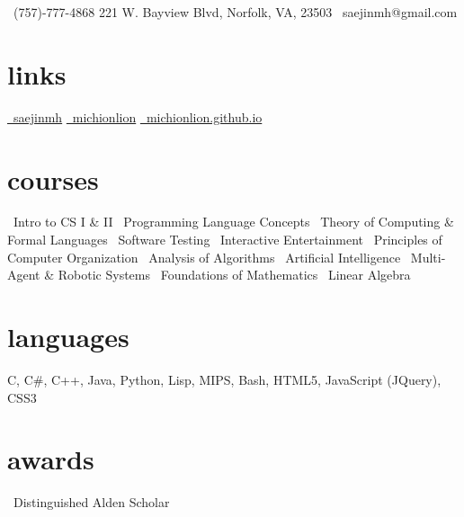 \documentclass[]{friggeri-cv}
\begin{document}
       {\faMobilePhone\ (757)-777-4868 \hspace{1cm} 221 W. Bayview Blvd, Norfolk, VA, 23503 \hspace{1cm} \faEnvelope\ saejinmh@gmail.com}

\begin{aside}
  \section{links}
    \href{https://www.linkedin.com/in/saejinmh}{\faLinkedin\ saejinmh}\vspace{0.03cm}
    \href{https://github.com/Michionlion}{\faGithub\ michionlion}\vspace{0.03cm}
    \href{https://michionlion.github.io}{\faGlobe\ michionlion.github.io}\vspace{0.03cm}
  \section{courses}
	\bullet\ Intro to CS I \& II\vspace{0.1cm}
	\bullet\ Programming Language Concepts\vspace{0.1cm}
	\bullet\ Theory of Computing \& Formal Languages\vspace{0.1cm}	
	\bullet\ Software Testing\vspace{0.1cm}
	\bullet\ Interactive Entertainment\vspace{0.1cm}
	\bullet\ Principles of Computer Organization\vspace{0.1cm}
    \bullet\ Analysis of Algorithms\vspace{0.1cm}
    \bullet\ Artificial Intelligence\vspace{0.1cm}
    \bullet\ Multi-Agent \& Robotic Systems\vspace{0.1cm}
    \bullet\ Foundations of Mathematics\vspace{0.1cm}
    \bullet\ Linear Algebra\vspace{0.1cm}
  \section{languages}
    C, C\#, C++, Java, Python, Lisp, MIPS, Bash, HTML5, JavaScript (JQuery), CSS3\vspace{0.1cm}
  \section{awards}
    \bullet\ Distinguished Alden Scholar\vspace{0.1cm}
\end{aside}
\end{document}
